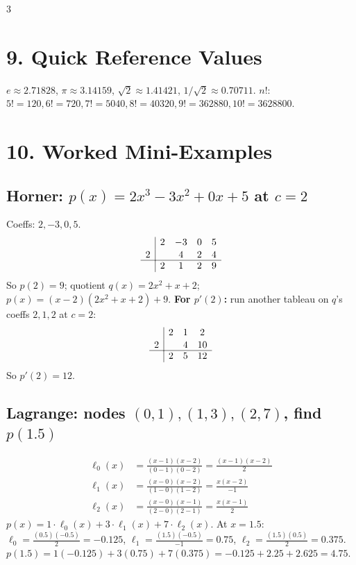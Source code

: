 \documentclass[9pt]{extarticle}
\begin{document}
\begin{multicols}{3}
\section{9. Quick Reference Values}
$e\approx2.71828$, $\pi\approx3.14159$, $\sqrt2\approx1.41421$, $1/\sqrt2\approx0.70711$.
$n!$: $5!=120,6!=720,7!=5040,8!=40320,9!=362880,10!=3628800$.

\section{10. Worked Mini-Examples}

\subsection{Horner: $p(x)=2x^3-3x^2+0x+5$ at $c=2$}
Coeffs: $2,-3,0,5$.
\[
\begin{array}{c|cccc}
 & 2 & -3 & 0 & 5\\[1pt]
2 & & 4 & 2 & 4\\[-1pt]
\hline
 & 2 & 1 & 2 & 9
\end{array}
\]
So $p(2)=9$; quotient $q(x)=2x^2+x+2$; $p(x)=(x-2)(2x^2+x+2)+9$.
\textbf{For $p'(2)$:} run another tableau on $q$'s coeffs $2,1,2$ at $c=2$:
\[
\begin{array}{c|ccc}
 & 2 & 1 & 2\\[1pt]
2 & & 4 & 10\\[-1pt]
\hline
 & 2 & 5 & 12
\end{array}
\]
So $p'(2)=12$.

\subsection{Lagrange: nodes $(0,1),(1,3),(2,7)$, find $p(1.5)$}
\begin{align*}
\ell_0(x)&=\tfrac{(x-1)(x-2)}{(0-1)(0-2)}=\tfrac{(x-1)(x-2)}{2}\\
\ell_1(x)&=\tfrac{(x-0)(x-2)}{(1-0)(1-2)}=\tfrac{x(x-2)}{-1}\\
\ell_2(x)&=\tfrac{(x-0)(x-1)}{(2-0)(2-1)}=\tfrac{x(x-1)}{2}
\end{align*}
$p(x)=1\cdot\ell_0(x)+3\cdot\ell_1(x)+7\cdot\ell_2(x)$. At $x=1.5$: $\ell_0=\tfrac{(0.5)(-0.5)}{2}=-0.125$, $\ell_1=\tfrac{(1.5)(-0.5)}{-1}=0.75$, $\ell_2=\tfrac{(1.5)(0.5)}{2}=0.375$.
$p(1.5)=1(-0.125)+3(0.75)+7(0.375)=-0.125+2.25+2.625=4.75$.


\end{multicols}
\end{document}
